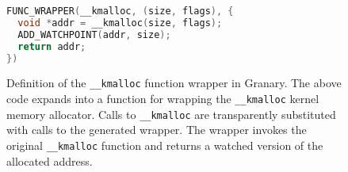 \documentclass[letterpaper,twocolumn,10pt]{article}
\let\ORIGcaption\caption
\renewcommand{\caption}[2][\compressedcaption]{%
\def\compressedcaption{#2}%
    \vspace{-12pt}%
    \ORIGcaption[#1]{#2}%
    \vspace{-12pt}}
\begin{document}


\begin{figure}
\begin{lstlisting}[language=C,basicstyle=\footnotesize\ttfamily]
FUNC_WRAPPER(__kmalloc, (size, flags), {
  void *addr = __kmalloc(size, flags);
  ADD_WATCHPOINT(addr, size);
  return addr;
})
\end{lstlisting}
\caption{\label{fig:kmalloc_wrapper}Definition of the \texttt{\_\_kmalloc} function wrapper in Granary. The above code expands into a function for wrapping the \texttt{\_\_kmalloc} kernel memory allocator. Calls to \texttt{\_\_kmalloc} are transparently substituted with calls to the generated wrapper. The wrapper invokes the original \texttt{\_\_kmalloc} function and returns a watched version of the allocated address.}
\end{figure}
\end{document}
